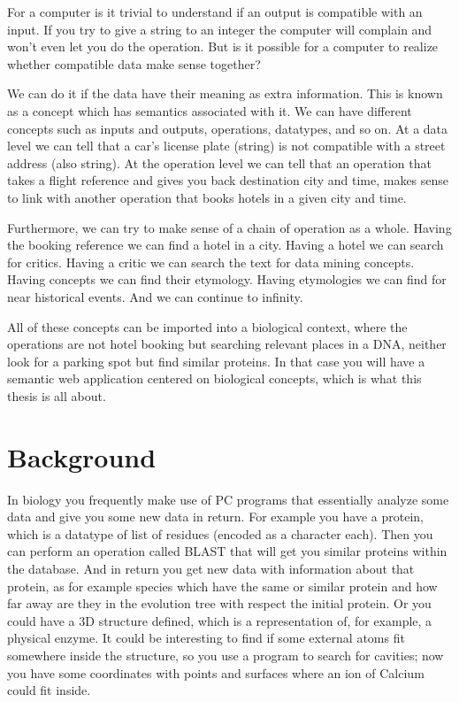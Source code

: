 \documentclass[a4paper,10pt]{article}
\begin{document}
For a computer is it trivial to understand if an output is compatible with an input. If you try to give a string to an integer the computer will complain and won't even let you do the operation. But is it possible for a computer to realize whether compatible data make sense together?\vspace{3 mm}

We can do it if the data have their meaning as extra information. This is known as a concept which has semantics associated with it. We can have different concepts such as inputs and outputs, operations, datatypes, and so on. At a data level we can tell that a car's license plate (string) is not compatible with a street address (also string). At the operation level we can tell that an operation that takes a flight reference and gives you back destination city and time, makes sense to link with another operation that books hotels in a given city and time.\vspace{3 mm}

Furthermore, we can try to make sense of a chain of operation as a whole. Having the booking reference we can find a hotel in a city. Having a hotel we can search for critics. Having a critic we can search the text for data mining concepts. Having concepts we can find their etymology. Having etymologies we can find for near historical events. And we can continue to infinity.\vspace{3 mm}

All of these concepts can be imported into a biological context, where the operations are not hotel booking but searching relevant places in a DNA, neither look for a parking spot but find similar proteins. In that case you will have a semantic web application centered on biological concepts, which is what this thesis is all about.

\newpage

\section{Background}
\label{chap:introduction}

In biology you frequently make use of PC programs that essentially analyze some data and give you some new data in return. For example you have a protein, which is a datatype of list of residues (encoded as a character each). Then you can perform an operation called BLAST that will get you similar proteins within the database. And in return you get new data with information about that protein, as for example species which have the same or similar protein and how far away are they in the evolution tree with respect the initial protein. Or you could have a 3D structure defined, which is a representation of, for example, a physical enzyme. It could be interesting to find if some external atoms fit somewhere inside the structure, so you use a program to search for cavities; now you have some coordinates with points and surfaces where an ion of Calcium could fit inside.\vspace{3 mm}
\end{document}
